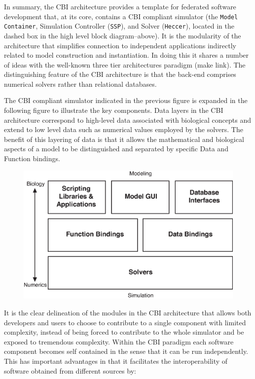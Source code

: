 \documentclass[12pt]{article}
\begin{document}
In summary, the CBI architecture provides a template for federated software development that, at its core, contains a CBI compliant simulator (the {\tt Model\,Container}, Simulation Controller ({\tt SSP}), and Solver ({\tt Heccer}), located in the dashed box in the high level block diagram--above). It is the modularity of the architecture that simplifies connection to independent applications indirectly related to model construction and instantiation. In doing this it shares a number of ideas with the well-known three tier architectures paradigm (make link). The distinguishing feature of the CBI architecture is that the back-end comprises numerical solvers rather than relational databases.

The CBI compliant simulator indicated in the previous figure is expanded in the following figure to illustrate the key components. Data layers in the CBI architecture correspond to high-level data associated with biological concepts and extend to low level data such as numerical values employed by the solvers. The benefit of this layering of data is that it allows the mathematical and biological aspects of a model to be distinguished and separated by specific Data and Function bindings.

\begin{figure}[h]
  \centering
 \includegraphics[scale=0.75]{figures/G3-CBI-Architecture-HiLevel.eps}
  \label{fig:archover}
\end{figure}

It is the clear delineation of the modules in the CBI architecture that allows both developers and users to choose to contribute to a single component with limited complexity, instead of being forced to contribute to the whole simulator and be exposed to tremendous complexity. Within the CBI paradigm each software component becomes self contained in the sense that it can be run independently. This has important advantages in that it facilitates the interoperability of software obtained from different sources by:
\end{document}
